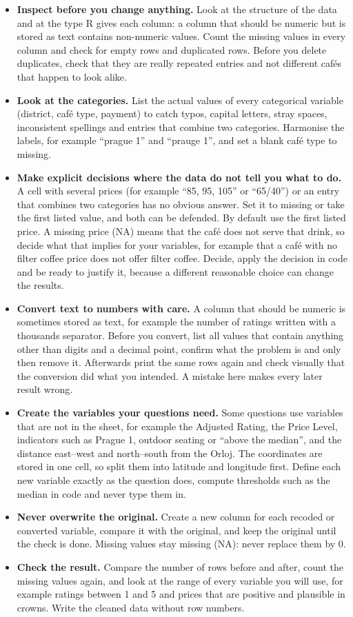 \documentclass[11pt,a4paper]{article}
\begin{document}
\begin{itemize}
	\item \textbf{Inspect before you change anything.} Look at the structure of the data and at the type R gives each column: a column that should be numeric but is stored as text contains non-numeric values. Count the missing values in every column and check for empty rows and duplicated rows. Before you delete duplicates, check that they are really repeated entries and not different caf\'es that happen to look alike.
	\item \textbf{Look at the categories.} List the actual values of every categorical variable (district, caf\'e type, payment) to catch typos, capital letters, stray spaces, inconsistent spellings and entries that combine two categories. Harmonise the labels, for example ``prague 1'' and ``prauge 1'', and set a blank caf\'e type to missing.
	\item \textbf{Make explicit decisions where the data do not tell you what to do.} A cell with several prices (for example ``85, 95, 105'' or ``65/40'') or an entry that combines two categories has no obvious answer. Set it to missing or take the first listed value, and both can be defended. By default use the first listed price. A missing price (NA) means that the caf\'e does not serve that drink, so decide what that implies for your variables, for example that a caf\'e with no filter coffee price does not offer filter coffee. Decide, apply the decision in code and be ready to justify it, because a different reasonable choice can change the results.
	\item \textbf{Convert text to numbers with care.} A column that should be numeric is sometimes stored as text, for example the number of ratings written with a thousands separator. Before you convert, list all values that contain anything other than digits and a decimal point, confirm what the problem is and only then remove it. Afterwards print the same rows again and check visually that the conversion did what you intended. A mistake here makes every later result wrong.
	\item \textbf{Create the variables your questions need.} Some questions use variables that are not in the sheet, for example the Adjusted Rating, the Price Level, indicators such as Prague 1, outdoor seating or ``above the median'', and the distance east--west and north--south from the Orloj. The coordinates are stored in one cell, so split them into latitude and longitude first. Define each new variable exactly as the question does, compute thresholds such as the median in code and never type them in.
	\item \textbf{Never overwrite the original.} Create a new column for each recoded or converted variable, compare it with the original, and keep the original until the check is done. Missing values stay missing (NA): never replace them by 0.
	\item \textbf{Check the result.} Compare the number of rows before and after, count the missing values again, and look at the range of every variable you will use, for example ratings between 1 and 5 and prices that are positive and plausible in crowns. Write the cleaned data without row numbers.
\end{itemize}
\end{document}
